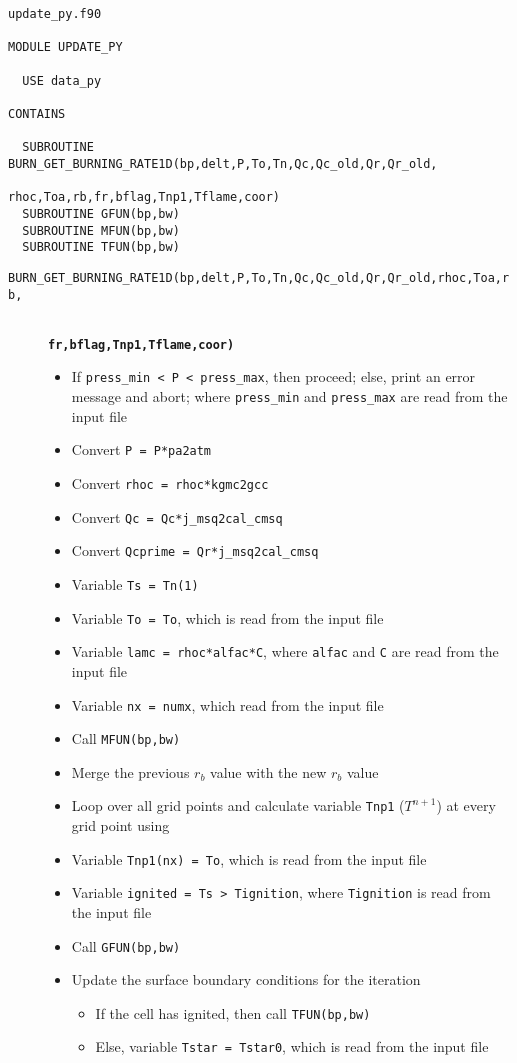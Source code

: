 
\begin{Verbatim}[frame=single]
                              update_py.f90

MODULE UPDATE_PY

  USE data_py

CONTAINS

  SUBROUTINE BURN_GET_BURNING_RATE1D(bp,delt,P,To,Tn,Qc,Qc_old,Qr,Qr_old,
                                     rhoc,Toa,rb,fr,bflag,Tnp1,Tflame,coor)
  SUBROUTINE GFUN(bp,bw)
  SUBROUTINE MFUN(bp,bw)
  SUBROUTINE TFUN(bp,bw)
\end{Verbatim}

\begin{description}

\item[\texttt{BURN\_GET\_BURNING\_RATE1D(bp,delt,P,To,Tn,Qc,Qc\_old,Qr,Qr\_old,rhoc,Toa,rb,}]{\hfill \\ \textbf{\texttt{fr,bflag,Tnp1,Tflame,coor)}} \vspace{-5pt}
\begin{itemize}
\item{If \texttt{press\_min < P < press\_max}, then proceed; else, print an error message and abort; where \texttt{press\_min} and \texttt{press\_max} are read from the input file}
\item{Convert \texttt{P = P*pa2atm}}
\item{Convert \texttt{rhoc = rhoc*kgmc2gcc}}
\item{Convert \texttt{Qc = Qc*j\_msq2cal\_cmsq}}
\item{Convert \texttt{Qcprime = Qr*j\_msq2cal\_cmsq}}
\item{Variable \texttt{Ts = Tn(1)}}
\item{Variable \texttt{To = To}, which is read from the input file}
\item{Variable \texttt{lamc = rhoc*alfac*C}, where \texttt{alfac} and \texttt{C} are read from the input file}
\item{Variable \texttt{nx = numx}, which read from the input file}
\item{Call \texttt{MFUN(bp,bw)}}
\item{Merge the previous $r_b$ value with the new $r_b$ value}
\item{Loop over all grid points and calculate variable \texttt{Tnp1} ($T^{n+1}$) at every grid point using }
\item{Variable \texttt{Tnp1(nx) = To}, which is read from the input file}
\item{Variable \texttt{ignited = Ts > Tignition}, where \texttt{Tignition} is read from the input file}
\item{Call \texttt{GFUN(bp,bw)}}
\item{Update the surface boundary conditions for the iteration}
	\begin{itemize}
		\item{If the cell has ignited, then call \texttt{TFUN(bp,bw)}}
		\item{Else, variable \texttt{Tstar = Tstar0}, which is read from the input file}
	\end{itemize}


\end{itemize}}
\end{description}
